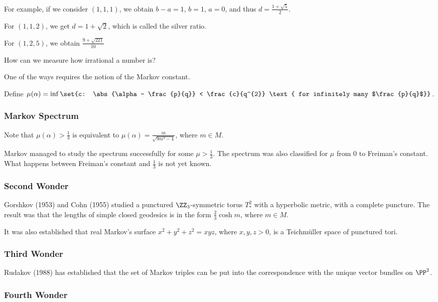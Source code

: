 \documentclass[11pt]{scrartcl}
\begin{document}
  For example, if we consider $(1, 1, 1)$, we obtain $b - a = 1$,
  $b = 1$, $a=0$, and thus $d = \frac{1+\sqrt{5}}{2}$.

  For $(1, 1, 2)$, we get $d = 1 + \sqrt{2}$, which is called the
  silver ratio.

  For $(1, 2, 5)$, we obtain $\frac{9+\sqrt{221}}{10}$

  How can we measure how irrational a number is?

  One of the ways requires the notion of the Markov constant.

  Define
  $\mu(\alpha) = \inf \set{c: \abs{\alpha - \frac{p}{q}} <
    \frac{c}{q^{2}} \text{ for infinitely many $\frac{p}{q}$}}$.

  \subsubsection{Markov Spectrum}

  Note that $\mu(\alpha) > \frac{1}{3}$ is equivalent to
  $\mu(\alpha) = \frac{m}{\sqrt{9m^{2}-4}}$, where $m\in M$.

  Markov managed to study the spectrum successfully for some
  $\mu > \frac{1}{3}$. The spectrum was also classified for $\mu$ from
  0 to Freiman's constant. What happens between Freiman's constant and
  $\frac{1}{3}$ is not yet known.

  \subsubsection{Second Wonder}
  Gorshkov (1953) and Cohn (1955) studied a punctured
  $\ZZ_{3}$-symmetric torus $T^{2}_{*}$ with a hyperbolic metric, with
  a complete puncture. The result was that the lengths of simple
  closed geodesics is in the form $\frac{2}{3} \cosh m$, where
  $m\in M$.

  It was also established that real Markov's surface $x^{2} + y^{2} + z^{2} = xyz$, where
  $x, y, z >0$, is a Teichm\"uller space of punctured tori.
  

  \subsubsection{Third Wonder}

  Rudakov (1988) has established that the set of Markov triples can be
  put into the correspondence with the unique vector bundles on
  $\PP^{2}$.
  
  \subsubsection{Fourth Wonder}
\end{document}

